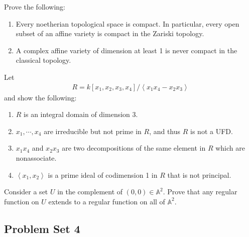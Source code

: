 \begin{exercise}[Gathmann 2.36]

Prove the following:

\begin{enumerate}
\def\labelenumi{\alph{enumi}.}
\item
  Every noetherian topological space is compact. In particular, every
  open subset of an affine variety is compact in the Zariski topology.
\item
  A complex affine variety of dimension at least 1 is never compact in
  the classical topology.
\end{enumerate}

\end{exercise}

\begin{exercise}[Gathmann 2.40]

Let
\begin{align*}  
R = k[x_1, x_2, x_3, x_4] / \left\langle{x_1 x_4 - x_2 x_3}\right\rangle 
\end{align*}
and show the following:

\begin{enumerate}
\def\labelenumi{\alph{enumi}.}
\item
  \(R\) is an integral domain of dimension 3.
\item
  \(x_1, \cdots, x_4\) are irreducible but not prime in \(R\), and thus
  \(R\) is not a UFD.
\item
  \(x_1 x_4\) and \(x_2 x_3\) are two decompositions of the same element
  in \(R\) which are nonassociate.
\item
  \(\left\langle{x_1, x_2}\right\rangle\) is a prime ideal of
  codimension 1 in \(R\) that is not principal.
\end{enumerate}

\end{exercise}

\begin{exercise}[Problem 5]

Consider a set \(U\) in the complement of \((0, 0) \in {\mathbb{A}}^2\).
Prove that any regular function on \(U\) extends to a regular function
on all of \({\mathbb{A}}^2\).

\end{exercise}

\hypertarget{problem-set-4}{%
\subsection{Problem Set 4}\label{problem-set-4}}

